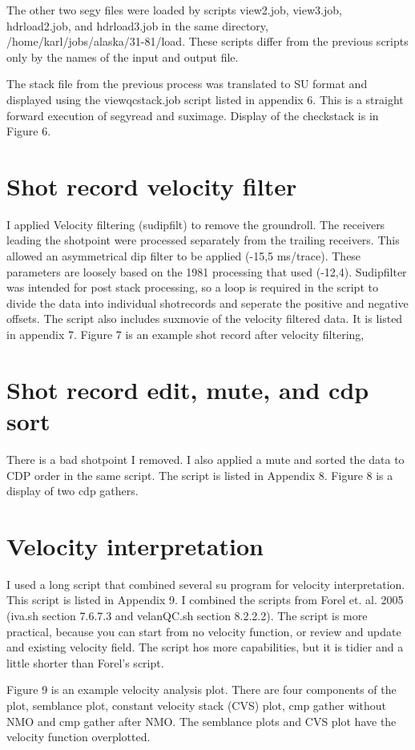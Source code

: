 The other two segy files were loaded by scripts view2.job, view3.job,
hdrload2.job, and hdrload3.job in the same directory,
/home/karl/jobs/alaska/31-81/load.  These scripts differ from the
previous scripts only by the names of the input and output file.

The stack file from the previous process was translated to SU format
and displayed using the viewqcstack.job script listed in appendix 6.
This is a straight forward execution of segyread and suximage.
Display of the checkstack is in Figure 6.


\section{Shot record velocity filter}
I applied Velocity filtering (sudipfilt) to remove the groundroll.
The receivers leading the shotpoint were processed separately from the
trailing receivers.  This allowed an asymmetrical dip filter to be
applied (-15,5 ms/trace).  These parameters are loosely based on the
1981 processing that used (-12,4). Sudipfilter was intended for post
stack processing, so a loop is required in the script to divide the
data into individual shotrecords and seperate the positive and
negative offsets.  The script also includes suxmovie of the velocity
filtered data.  It is listed in appendix 7.  Figure 7 is an example
shot record after velocity filtering,


\section{Shot record edit, mute, and cdp sort}
There is a bad shotpoint I removed.  I also applied a mute and sorted
the data to CDP order in the same script.  The script is listed in
Appendix 8.  Figure 8 is a display of two cdp gathers.


\section{Velocity interpretation}
I used a long script that combined several su program for velocity
interpretation.  This script is listed in Appendix 9.  I combined the
scripts from Forel et. al. 2005 (iva.sh section 7.6.7.3 and velanQC.sh
section 8.2.2.2).  The script is more practical, because you can start
from no velocity function, or review and update and existing velocity
field.  The script hos more capabilities, but it is tidier and a
little shorter than Forel's script.

Figure 9 is an example velocity analysis plot.  There are four
components of the plot, semblance plot, constant velocity stack (CVS)
plot, cmp gather without NMO and cmp gather after NMO.  The semblance
plots and CVS plot have the velocity function overplotted.

